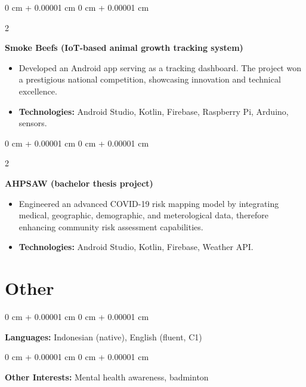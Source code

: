 \documentclass[10pt, a4paper]{article}
\newenvironment{highlights}{
    \begin{itemize}[
        topsep=0.10 cm,
        parsep=0.10 cm,
        partopsep=0pt,
        itemsep=0pt,
        leftmargin=0 cm + 10pt
    ]
}{
    \end{itemize}
} %
\newenvironment{onecolentry}{
    \begin{adjustwidth}{
        0 cm + 0.00001 cm
    }{
        0 cm + 0.00001 cm
    }
}{
    \end{adjustwidth}
} %
\newenvironment{twocolentry}[2][]{
    \onecolentry
    \def\secondColumn{#2}
    \setcolumnwidth{\fill, 3 cm}
    \begin{paracol}{2}
}{
    \switchcolumn \raggedleft \secondColumn
    \end{paracol}
    \endonecolentry
} %
\begin{document}
        \vspace{0.2 cm}

        \begin{twocolentry}{
            2021
        }
            \textbf{Smoke Beefs (IoT-based animal growth tracking system)}
            \begin{highlights}
                \item Developed an Android app serving as a tracking dashboard. The project won a prestigious national competition, showcasing innovation and technical excellence.
                \item \textbf{Technologies:} Android Studio, Kotlin, Firebase, Raspberry Pi, Arduino, sensors.
            \end{highlights}
        \end{twocolentry}


        \vspace{0.2 cm}

        \begin{twocolentry}{
            2020
        }
            \textbf{AHPSAW (bachelor thesis project)}
            \begin{highlights}
                \item Engineered an advanced COVID-19 risk mapping model by integrating medical, geographic, demographic, and meterological data, therefore enhancing community risk assessment capabilities.
                \item \textbf{Technologies:} Android Studio, Kotlin, Firebase, Weather API.
            \end{highlights}
        \end{twocolentry}



    
    \section{Other}



        
        \begin{onecolentry}
            \textbf{Languages:} Indonesian (native), English (fluent, C1)
        \end{onecolentry}

        \vspace{0.2 cm}

        \begin{onecolentry}
            \textbf{Other Interests:} Mental health awareness, badminton
        \end{onecolentry}


    
\end{document}
